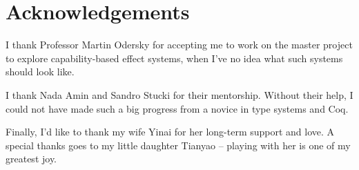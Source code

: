 \section*{\centering Acknowledgements}

I thank Professor Martin Odersky for accepting me to work on the
master project to explore capability-based effect systems, when I've
no idea what such systems should look like.

I thank Nada Amin and Sandro Stucki for their mentorship. Without
their help, I could not have made such a big progress from a novice in
type systems and Coq.

Finally, I'd like to thank my wife Yinai for her long-term support and
love. A special thanks goes to my little daughter Tianyao -- playing
with her is one of my greatest joy.
